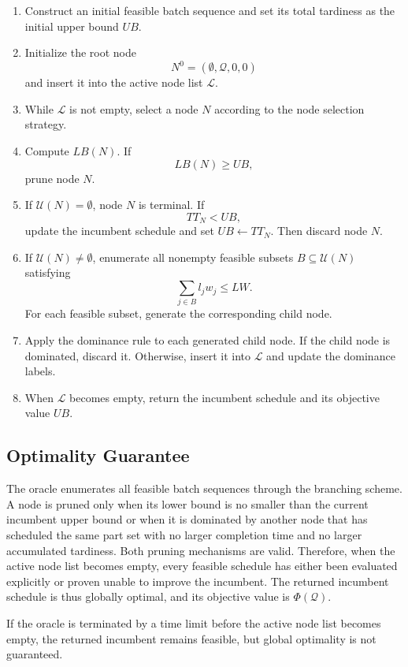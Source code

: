 \documentclass[letterpaper, 10 pt, conference]{ieeeconf}  %
\begin{document}
\begin{enumerate}
	\item Construct an initial feasible batch sequence and set its total
	tardiness as the initial upper bound $UB$.
	
	\item Initialize the root node
	\[
	N^0=(\emptyset,\mathcal{Q},0,0)
	\]
	and insert it into the active node list $\mathcal{L}$.
	
	\item While $\mathcal{L}$ is not empty, select a node $N$ according to
	the node selection strategy.
	
	\item Compute $LB(N)$. If
	\[
	LB(N)\ge UB,
	\]
	prune node $N$.
	
	\item If $\mathcal{U}(N)=\emptyset$, node $N$ is terminal. If
	\[
	TT_N<UB,
	\]
	update the incumbent schedule and set $UB\leftarrow TT_N$. Then discard
	node $N$.
	
	\item If $\mathcal{U}(N)\neq\emptyset$, enumerate all nonempty feasible
	subsets $B\subseteq\mathcal{U}(N)$ satisfying
	\[
	\sum_{j\in B}l_jw_j\le LW.
	\]
	For each feasible subset, generate the corresponding child node.
	
	\item Apply the dominance rule to each generated child node. If the
	child node is dominated, discard it. Otherwise, insert it into
	$\mathcal{L}$ and update the dominance labels.
	
	\item When $\mathcal{L}$ becomes empty, return the incumbent schedule
	and its objective value $UB$.
\end{enumerate}

\subsection{Optimality Guarantee}

The oracle enumerates all feasible batch sequences through the branching
scheme. A node is pruned only when its lower bound is no smaller than the
current incumbent upper bound or when it is dominated by another node that
has scheduled the same part set with no larger completion time and no larger
accumulated tardiness. Both pruning mechanisms are valid. Therefore, when
the active node list becomes empty, every feasible schedule has either been
evaluated explicitly or proven unable to improve the incumbent. The returned
incumbent schedule is thus globally optimal, and its objective value is
$\Phi(\mathcal{Q})$.

If the oracle is terminated by a time limit before the active node list
becomes empty, the returned incumbent remains feasible, but global
optimality is not guaranteed.
\end{document}
